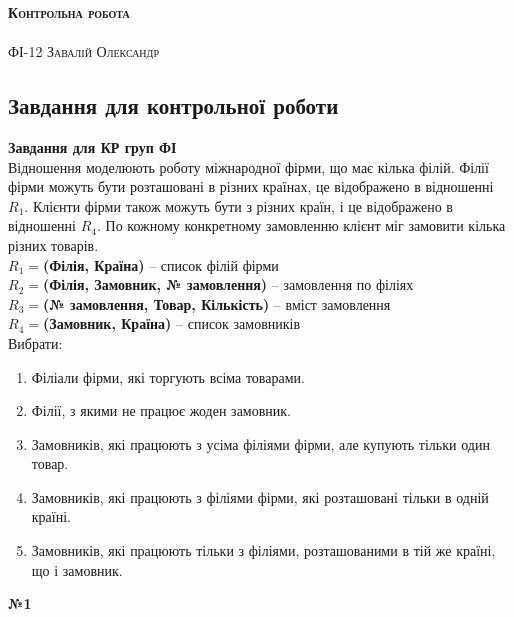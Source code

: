 \documentclass[a4paper,12pt]{article}
\begin{document}
	\begin{center}
		{\Large \bfseries \textsc{Контрольна робота}}\\
		\hrulefill\\
		\Large \textsc{ФІ-12 Завалій Олександр}
	\end{center}
	\begin{center}
		\section*{\bfseries{Завдання для контрольної роботи}}
	\end{center} 
	\textbf{Завдання для КР груп ФІ} \\
	Відношення моделюють роботу міжнародної фірми, що має кілька філій. Філії фірми можуть бути розташовані в різних країнах, це відображено в відношенні $R_1$. Клієнти фірми також можуть бути з різних країн, і це відображено в відношенні $R_4$. По кожному конкретному замовленню клієнт міг замовити кілька різних товарів. \\
	\textbf{$R_1=$(Філія, Країна)} – список філій  фірми\\
	\textbf{$R_2=$(Філія, Замовник, № замовлення)} – замовлення по філіях \\
	\textbf{$R_3=$(№ замовлення, Товар, Кількість)} – вміст замовлення \\
	\textbf{$R_4=$(Замовник, Країна)} – список замовників \\
	Вибрати: 
	\begin{enumerate}
		\item Філіали фірми, які торгують всіма товарами. 
		\item Філії, з якими не працює жоден замовник. 
		\item Замовників, які працюють з усіма філіями фірми, але купують тільки один товар. 
		\item Замовників, які працюють з філіями фірми, які розташовані тільки в одній країні. 
		\item Замовників, які працюють тільки з філіями, розташованими в тій же країні, що і замовник. 
	\end{enumerate}
	\begin{center}
		\textbf{№1}
	\end{center}
\end{document}
